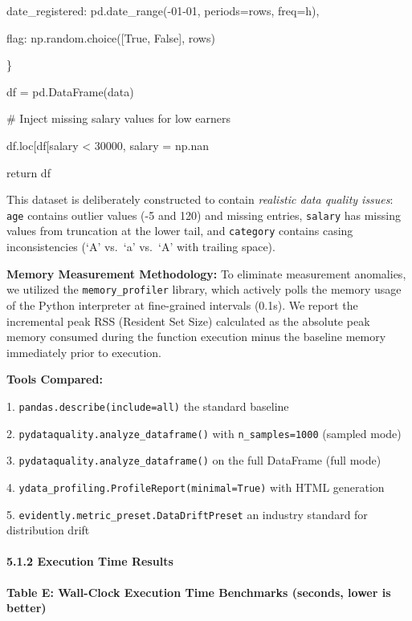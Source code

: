 \documentclass{article}
\begin{document}
\textquotesingle date\_registered\textquotesingle:
pd.date\_range(-01-01\textquotesingle, periods=rows,
freq=\textquotesingle h\textquotesingle),

\textquotesingle flag\textquotesingle: np.random.choice({[}True,
False{]}, rows)

\}

df = pd.DataFrame(data)

\# Inject missing salary values for low earners

df.loc{[}df{[}\textquotesingle salary\textquotesingle{]} <
30000, \textquotesingle salary\textquotesingle{]} = np.nan

return df

This dataset is deliberately constructed to contain \emph{realistic data
quality issues}: \texttt{age} contains outlier values (-5 and 120) and
missing entries, \texttt{salary} has missing values from truncation at
the lower tail, and \texttt{category} contains casing inconsistencies
(`A' vs.~`a' vs.~`A' with trailing space).

\textbf{Memory Measurement Methodology:} To eliminate measurement
anomalies, we utilized the \texttt{memory\_profiler} library, which
actively polls the memory usage of the Python interpreter at
fine-grained intervals (0.1s). We report the incremental peak RSS
(Resident Set Size) calculated as the absolute peak memory consumed
during the function execution minus the baseline memory immediately
prior to execution.

\textbf{Tools Compared:}

1. \texttt{pandas.describe(include=all)} the standard baseline

2. \texttt{pydataquality.analyze\_dataframe()} with
\texttt{n\_samples=1000} (sampled mode)

3. \texttt{pydataquality.analyze\_dataframe()} on the full DataFrame
(full mode)

4. \texttt{ydata\_profiling.ProfileReport(minimal=True)} with HTML
generation

5. \texttt{evidently.metric\_preset.DataDriftPreset} an industry
standard for distribution drift

\paragraph{5.1.2 Execution Time Results}\label{execution-time-results}

\textbf{Table E: Wall-Clock Execution Time Benchmarks (seconds, lower is
better)}
\end{document}

